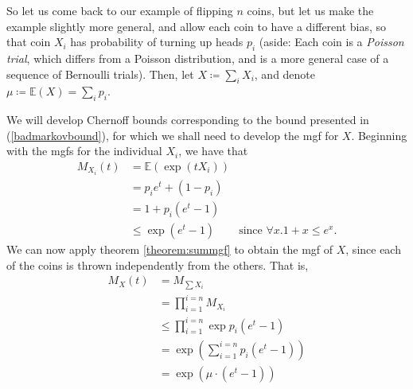 	So let us come back to our example of flipping $n$ coins, but let us make the example 
	slightly more general, and allow each coin to have a different bias, so that coin $X_i$ has 
	probability of turning up heads $p_i$ (aside: Each coin is a \emph{Poisson trial}, which 
	differs from a Poisson distribution, and is a more general case of a sequence of Bernoulli 
	trials). Then, let $X \coloneqq \sum_i X_i$, and denote $\mu \coloneqq \mathbb{E}(X) = 
	\sum_i p_i$.\par

	We will develop Chernoff bounds corresponding to the bound presented in 
	(\ref{badmarkovbound}), for which we shall need to develop the mgf for $X$. Beginning with 
	the mgfs for the individual $X_i$, we have that
	\begin{align*}
		M_{X_i}(t) &= \mathbb{E}(\exp(tX_i)) \\
		&= p_i e^t + (1-p_i)\\
		&= 1 + p_i (e^t-1) \\
		&\leq \exp(e^t - 1) & \text{since $\forall x. 1+x \leq e^x$.}
	\end{align*}
	We can now apply theorem \ref{theorem:summgf} to obtain the mgf of $X$, since each of the 
	coins is thrown independently from the others. That is, 
	\begin{align*}
		M_X(t) &= M_{\sum X_i} \\
		&= \prod_{i=1}^{i=n} M_{X_i} \\
		&\leq \prod_{i=1}^{i=n} \exp{p_i(e^t- 1)} \\
		&=\exp\left(\sum_{i=1}^{i=n}p_i(e^t - 1)\right) \\
		&=\exp(\mu \cdot (e^t- 1))
	\end{align*}

